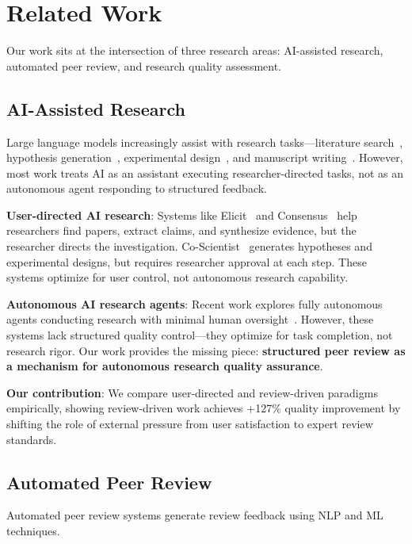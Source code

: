 \section{Related Work}
\label{sec:related}

Our work sits at the intersection of three research areas: AI-assisted research, automated peer review, and research quality assessment.

\subsection{AI-Assisted Research}

Large language models increasingly assist with research tasks---literature search~\cite{liang2024can}, hypothesis generation~\cite{wang2023scientific}, experimental design~\cite{boiko2023autonomous}, and manuscript writing~\cite{zhou2024large}. However, most work treats AI as an assistant executing researcher-directed tasks, not as an autonomous agent responding to structured feedback.

\textbf{User-directed AI research}: Systems like Elicit~\cite{elicit2023} and Consensus~\cite{consensus2023} help researchers find papers, extract claims, and synthesize evidence, but the researcher directs the investigation. Co-Scientist~\cite{lu2024ai} generates hypotheses and experimental designs, but requires researcher approval at each step. These systems optimize for user control, not autonomous research capability.

\textbf{Autonomous AI research agents}: Recent work explores fully autonomous agents conducting research with minimal human oversight~\cite{bran2024chemcrow, wang2024chemreasoner}. However, these systems lack structured quality control---they optimize for task completion, not research rigor. Our work provides the missing piece: \textbf{structured peer review as a mechanism for autonomous research quality assurance}.

\textbf{Our contribution}: We compare user-directed and review-driven paradigms empirically, showing review-driven work achieves +127\% quality improvement by shifting the role of external pressure from user satisfaction to expert review standards.

\subsection{Automated Peer Review}

Automated peer review systems generate review feedback using NLP and ML techniques.


